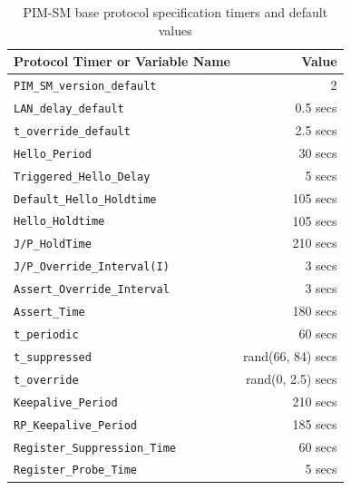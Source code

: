 \documentclass[11pt]{report}
\begin{document}
%
%
\newcommand{\PimsmVersionDefault}{PIM-SMv2}	       %
\newcommand{\PimsmLanDelayDefault}{0.5 secs}		%
\newcommand{\PimsmTOverrideDefault}{2.5 secs}		%
\newcommand{\PimsmHelloPeriod}{30 secs}			%
\newcommand{\PimsmTriggeredHelloDelay}{5 secs}		%
\newcommand{\PimsmDefaultHelloHoldtime}{105 secs}      %
\newcommand{\PimsmHelloHoldtime}{105 secs}		%
\newcommand{\PimsmJPHoldTime}{210 secs}			%
\newcommand{\PimsmJPOverrideIntervalI}{3 secs}	     %
\newcommand{\PimsmAssertOverrideInterval}{3 secs}    %
\newcommand{\PimsmAssertTime}{180 secs}			%
\newcommand{\PimsmTPeriodic}{60 secs}			%
\newcommand{\PimsmTSuppressed}{rand(66, 84) secs}	%
\newcommand{\PimsmTOverride}{rand(0, 2.5) secs}		%
\newcommand{\PimsmKeepalivePeriod}{210 secs}		%
\newcommand{\PimsmRPKeepalivePeriod}{185 secs}		%
\newcommand{\PimsmRegisterSuppressionTime}{60 secs} %
\newcommand{\PimsmRegisterProbeTime}{5 secs}		%

\begin{table}[h]
\begin{center}
\begin{tabular}{|l|r|}
\hline
Protocol Timer or Variable Name	& Value		\\
\hline
\hline
\verb=PIM_SM_version_default=	& 2		\\	%
\verb=LAN_delay_default=	& 0.5 secs	\\
\verb=t_override_default=	& 2.5 secs	\\
\verb=Hello_Period=		& 30 secs	\\
\verb=Triggered_Hello_Delay=	& 5 secs	\\
\verb=Default_Hello_Holdtime=	& 105 secs	\\
\verb=Hello_Holdtime=		& 105 secs	\\
\verb=J/P_HoldTime=		& 210 secs	\\
\verb=J/P_Override_Interval(I)=	& 3 secs	\\
\verb=Assert_Override_Interval=	& 3 secs	\\
\verb=Assert_Time=		& 180 secs	\\
\verb=t_periodic=		& 60 secs	\\
\verb=t_suppressed=		& rand(66, 84) secs \\
\verb=t_override=		& rand(0, 2.5) secs \\
\verb=Keepalive_Period=		& 210 secs	\\
\verb=RP_Keepalive_Period=	& 185 secs	\\
\verb=Register_Suppression_Time= & 60 secs	\\
\verb=Register_Probe_Time=	& 5 secs	\\
\hline
\end{tabular}
\caption{PIM-SM base protocol specification timers and default values}
\label{table:pim_sm_base_spec_values}
\end{center}
\end{table}
\end{document}
